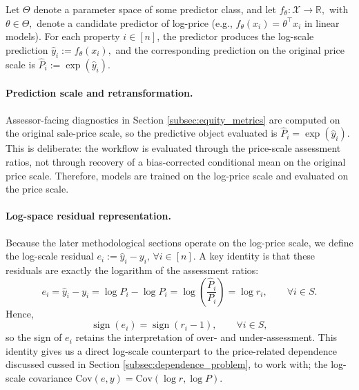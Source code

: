\documentclass[12pt, draft]{article}
\theoremstyle{plain}
\theoremstyle{definition}
\newcommand{\1}{\mathbf{1}}
\newcommand{\Cov}{\text{Cov}}
\begin{document}
{Let $\Theta$ denote a parameter space of some predictor class, and let
$
f_\theta:\mathcal X\to\mathbb R,$
with $
\theta\in\Theta ,
$
denote a candidate predictor of log-price (e.g., $f_\theta(x_i)=\theta^\top x_i$ in linear models). For each property $i\in[n]$, the predictor produces the log-scale prediction
$
\hat y_i := f_\theta(x_i),
$
and the corresponding prediction on the original price scale is
$
\widehat P_i := \exp(\hat y_i).
$

\paragraph{Prediction scale and retransformation.}
Assessor-facing diagnostics in Section \ref{subsec:equity_metrics} are computed on the original sale-price scale, so the predictive object evaluated is $\widehat P_i=\exp(\hat y_i)$. This is deliberate: the workflow is evaluated through the price-scale assessment ratios, not through recovery of a bias-corrected conditional mean on the original price scale. Therefore, models are trained on the log-price scale and evaluated on the price scale.

\paragraph{Log-space residual representation.}
Because the later methodological sections operate on the log-price scale, we define the log-scale residual
$
e_i := \hat y_i-y_i, \, \forall i \in [n].
$
A key identity is that these residuals are exactly the logarithm of the assessment ratios:
\begin{equation}
\label{eq:log_ratio_identity}
e_i
=
\hat y_i-y_i
=
\log \widehat P_i-\log P_i
=
\log\!\left(\frac{\widehat P_i}{P_i}\right)
=
\log r_i,
\qquad \forall i\in S.
\end{equation}
Hence,
\[
\operatorname{sign}(e_i)=\operatorname{sign}(r_i-1),
\qquad \forall i\in S,
\]
so the sign of $e_i$ retains the interpretation of over- and under-assessment. This identity gives us a direct log-scale counterpart to the price-related dependence discussed cussed in Section \ref{subsec:dependence_problem}, to work with; the log-scale covariance $\Cov(e, y) = \Cov(\log r, \log P)$. 




}
\end{document}
